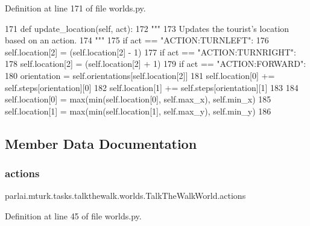 Definition at line 171 of file worlds.\+py.


\begin{DoxyCode}
171     \textcolor{keyword}{def }update\_location(self, act):
172         \textcolor{stringliteral}{"""}
173 \textcolor{stringliteral}{        Updates the tourist's location based on an action.}
174 \textcolor{stringliteral}{        """}
175         \textcolor{keywordflow}{if} act == \textcolor{stringliteral}{"ACTION:TURNLEFT"}:
176             self.location[2] = (self.location[2] - 1) %
177         \textcolor{keywordflow}{if} act == \textcolor{stringliteral}{"ACTION:TURNRIGHT"}:
178             self.location[2] = (self.location[2] + 1) %
179         \textcolor{keywordflow}{if} act == \textcolor{stringliteral}{"ACTION:FORWARD"}:
180             orientation = self.orientations[self.location[2]]
181             self.location[0] += self.steps[orientation][0]
182             self.location[1] += self.steps[orientation][1]
183 
184             self.location[0] = max(min(self.location[0], self.max\_x), self.min\_x)
185             self.location[1] = max(min(self.location[1], self.max\_y), self.min\_y)
186 
\end{DoxyCode}


\subsection{Member Data Documentation}
\mbox{\label{classparlai_1_1mturk_1_1tasks_1_1talkthewalk_1_1worlds_1_1TalkTheWalkWorld_ae00f1f770c581d198b89995116c25bf3}} 
\subsubsection{\texorpdfstring{actions}{actions}}
{\footnotesize\ttfamily parlai.\+mturk.\+tasks.\+talkthewalk.\+worlds.\+Talk\+The\+Walk\+World.\+actions}



Definition at line 45 of file worlds.\+py.

\mbox{\label{classparlai_1_1mturk_1_1tasks_1_1talkthewalk_1_1worlds_1_1TalkTheWalkWorld_aab08ccc1bfb83c6e440d7354d923f942}} 
